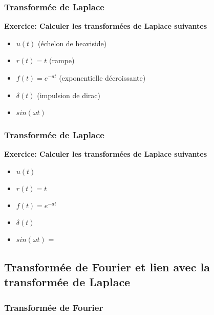 \documentclass{beamer}
\begin{document}
\begin{frame} 
\frametitle{Transformée de Laplace}

\textbf{Exercice: Calculer les transformées de Laplace suivantes}\\
\vspace{1cm}
\begin{itemize}
\item $u(t)$ (échelon de heaviside)
\item $r(t) = t$ (rampe)
\item $f(t) = e^{-at}$ (exponentielle décroissante)
\item $\delta (t)$ (impulsion de dirac) 
\item $sin(\omega t)$
\end{itemize}

\end{frame} 

\begin{frame} 
\frametitle{Transformée de Laplace}

\textbf{Exercice: Calculer les transformées de Laplace suivantes}\\
\vspace{1cm}
\begin{itemize}
\item $u(t)$   
\item $r(t) = t$   
\item $f(t) = e^{-at}$  
\item $\delta (t)$  
\item $sin(\omega t)$ = 
\end{itemize}

\end{frame}

\subsection{Transformée de Fourier et lien avec la transformée de Laplace}

\subsubsection{Transformée de Fourier}
\end{document}
